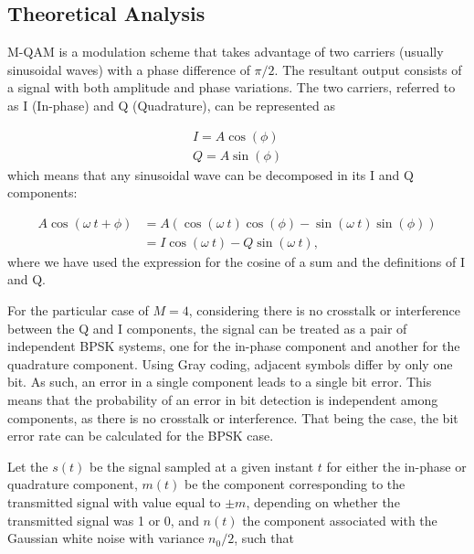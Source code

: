 
\subsection{Theoretical Analysis}

M-QAM is a modulation scheme that takes advantage of two carriers (usually sinusoidal waves) with a phase difference of $\pi/2$. The resultant output consists of a signal with both amplitude and phase variations. The two carriers, referred to as I (In-phase) and Q (Quadrature), can be represented as

\begin{align}
	I=A\cos(\phi) \\
	Q=A\sin(\phi)
\end{align}
which means that any sinusoidal wave can be decomposed in its I and Q components:

\begin{align}
	A\cos(\omega~t+\phi)&=A\left(\cos(\omega~t)\cos(\phi)-\sin(\omega~t)\sin(\phi)\right) \\
	&=I\cos(\omega~t)-Q\sin(\omega~t),
\end{align}
where we have used the expression for the cosine of a sum and the definitions of I and Q.



For the particular case of $M=4$, considering there is no crosstalk or interference between the Q and I components, the signal can be treated as a pair of independent BPSK systems, one for the in-phase component and another for the quadrature component.
Using Gray coding, adjacent symbols differ by only one bit. As such, an error in a single component leads to a single bit error.
This means that the probability of an error in bit detection is independent among components, as there is no crosstalk or interference. That being the case, the bit error rate can be calculated for the BPSK case.


Let the $s(t)$ be the signal sampled at a given instant $t$ for either the in-phase or quadrature component, $m(t)$ be the component corresponding to the transmitted signal with value equal to $\pm m$, depending on whether the transmitted signal was 1 or 0, and $n(t)$ the component associated with the Gaussian white noise with variance $n_0/2$, such that

